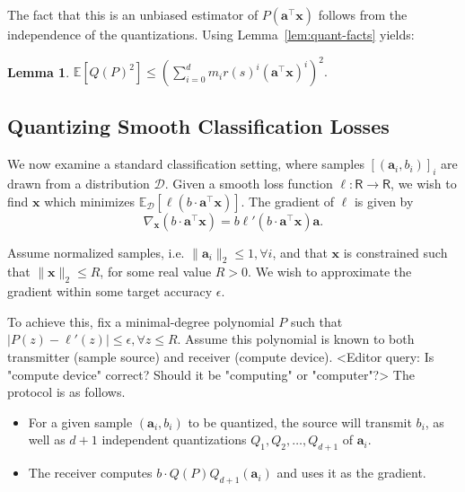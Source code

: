\documentclass{article}
\newcommand{\R}{\mathsf{R}}
\renewcommand{\vec}[1]{\mathbf{#1}}
\def\E{\mathbb{E}}
\newtheorem{lemma}{Lemma}
\begin{document}
\vspace{-1em}
The fact that this is an unbiased estimator of $P( \vec{a}^\top \vec{x} )$ follows from the independence of the quantizations. Using Lemma~\ref{lem:quant-facts} yields:

\begin{lemma}
\label{lem:poly-sec-moment-bound}
	$\E[ Q(P)^2 ] \leq \left(\sum_{i = 0}^d m_i r(s)^i (\vec{a}^\top \vec{x})^i\right)^2.$
\end{lemma} 



\vspace{-0.5em}
\subsection{Quantizing Smooth Classification Losses}
\vspace{-0.5em}

We now examine a standard classification setting, where samples $[(\vec{a}_i, b_i)]_i$ are drawn from a distribution $\mathcal{D}$. Given a smooth loss function $\ell: \R \rightarrow \R$, we wish to find $\vec{x}$ which minimizes $\E_{\mathcal{D}} [ \ell( b \cdot \vec{a}^\top \vec{x}) ]$. The gradient of $\ell$ is given by 
$$ \nabla_\vec{x} (b \cdot \vec{a}^\top \vec{x}) = b \ell' (b \cdot \vec{a}^\top \vec{x}) \vec{a}.$$

Assume normalized samples, i.e. $\| \vec{a}_i \|_2 \leq 1, \forall i$, and that $\vec{x}$ is constrained such that $\| \vec{x} \|_2 \leq R$, for some real value $R > 0$. We wish to approximate the gradient within some target accuracy $\epsilon$. 

To achieve this, fix a minimal-degree polynomial $P$ such that $|P(z) - \ell'(z)| \leq \epsilon, \forall z \leq R$. Assume this polynomial is known to both transmitter (sample source) and receiver (compute device). <Editor query: Is "compute device" correct? Should it be "computing" or "computer"?> The protocol is as follows. 
\vspace{-0.5em}
\begin{itemize}
    \vspace{-0.5em}
	\item For a given sample $(\vec{a}_i, b_i)$ to be quantized, the source will transmit $b_i$, as well as $d + 1$ independent quantizations $Q_1, Q_2, \ldots, Q_{d + 1}$ of $\vec{a}_i$. 
    \vspace{-0.5em}
	\item The receiver computes $b \cdot Q(P) Q_{d + 1} ( \vec{a}_i )$ and uses it as the gradient.
\end{itemize}
\end{document}
